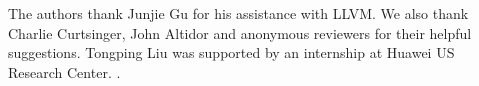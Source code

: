 The authors thank Junjie Gu for his assistance with LLVM. 
We also thank Charlie Curtsinger, John Altidor and anonymous reviewers for their helpful suggestions. Tongping Liu was supported by an internship at Huawei US Research Center. .  
